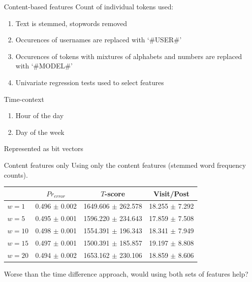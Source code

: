\documentclass[12pt]{presentation}
\begin{document}
\begin{frame}{Content-based features}
	Count of individual tokens used:
	\begin{enumerate}
		\item Text is stemmed, stopwords removed
		\item Occurences of usernames are replaced with `\#USER\#'
		\item Occurences of tokens with mixtures of alphabets and numbers are 
			replaced with `\#MODEL\#'
		\item Univariate regression tests used to select features
	\end{enumerate}
\end{frame}
\begin{frame}{Time-context}
	\begin{enumerate}
		\item Hour of the day
		\item Day of the week
	\end{enumerate}
	Represented as bit vectors
\end{frame}

\begin{frame}{Content features only}
	Using only the content features (stemmed word frequency counts).
	\begin{center}
		\footnotesize
		\begin{tabular}{ | l | c | c | c | }
			\hline
		& $Pr_{error}$		  & $T$-score			   &	Visit/Post\\
			\hline
        $w=1$ &		0.496 $\pm$ 0.002 &	1649.606 $\pm$ 262.578  &	18.255 $\pm$ 7.292 \\
        $w=5$ &		0.495 $\pm$ 0.001 &	1596.220 $\pm$ 234.643  &	17.859 $\pm$ 7.508 \\
       $w=10$ &		0.498 $\pm$ 0.001 &	1554.391 $\pm$ 196.343 &  	18.341 $\pm$ 7.949 \\
\rowcolor{green}
       $w=15$ &		0.497 $\pm$ 0.001 &	1500.391 $\pm$ 185.857 &  	19.197 $\pm$ 8.808 \\
       $w=20$ &		0.494 $\pm$ 0.002 &	1653.162 $\pm$ 230.106 &  	18.859 $\pm$ 8.606 \\
			\hline
		\end{tabular}
	\end{center}
	Worse than the time difference approach, would using both sets of features help?
\end{frame}
\end{document}
